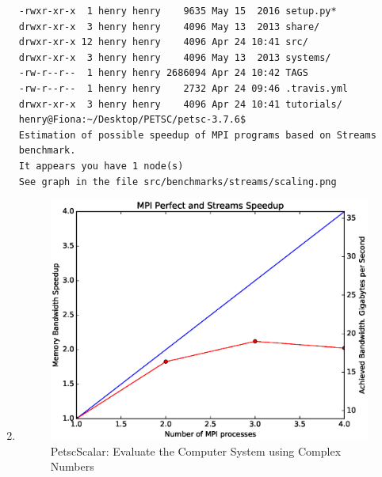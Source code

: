 \documentclass{article}
\begin{document}
\begin{enumerate}
\begin{verbatim}
-rwxr-xr-x  1 henry henry    9635 May 15  2016 setup.py*
drwxr-xr-x  3 henry henry    4096 May 13  2013 share/
drwxr-xr-x 12 henry henry    4096 Apr 24 10:41 src/
drwxr-xr-x  3 henry henry    4096 May 13  2013 systems/
-rw-r--r--  1 henry henry 2686094 Apr 24 10:42 TAGS
-rw-r--r--  1 henry henry    2732 Apr 24 09:46 .travis.yml
drwxr-xr-x  3 henry henry    4096 Apr 24 10:41 tutorials/
henry@Fiona:~/Desktop/PETSC/petsc-3.7.6$
Estimation of possible speedup of MPI programs based on Streams benchmark.
It appears you have 1 node(s)
See graph in the file src/benchmarks/streams/scaling.png
\end{verbatim}
\normalsize
\item
\begin{figure}[htp]
    \centering
    \includegraphics[width=.8\textwidth, height=.4\textwidth]{petsc_3_5_4_with_fftw_download_BLAS_LAPACK_MPI_and_complex_number_configuration_Aug_11_2017.eps}
    \caption*{PetscScalar: Evaluate the Computer System using Complex Numbers}
    \label{checkerboard_lattice}
\end{figure}
\end{enumerate}
\end{document}
